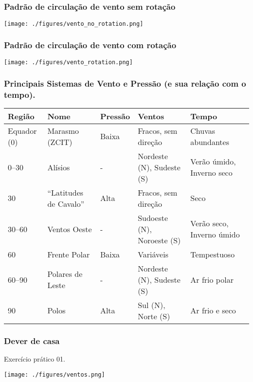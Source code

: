 \begin{frame}
  \frametitle{Padrão de circulação de vento {\bf sem} rotação}
  \begin{center}
    \texttt{[image: ./figures/vento\_no\_rotation.png]}
  \end{center}
\end{frame}

\begin{frame}
  \frametitle{Padrão de circulação de vento {\bf com} rotação}
  \begin{center}
    \texttt{[image: ./figures/vento\_rotation.png]}
  \end{center}
\end{frame}

\begin{frame}
\frametitle{Principais Sistemas de Vento e Pressão (e sua relação com o tempo).}
{\tiny
\begin{table}
    \begin{tabular}{lllll}
    Região                           & Nome                     & Pressão & Ventos                     & Tempo                     \\
        \hline
    Equador (0\textdegree{})         & Marasmo (ZCIT)           & Baixa   & Fracos, sem direção        & Chuvas abundantes         \\
    0\textdegree{}--30\textdegree{}  & Alísios                  & -       & Nordeste (N), Sudeste (S)  & Verão úmido, Inverno seco \\
    30\textdegree{}                  & ``Latitudes de Cavalo''  & Alta    & Fracos, sem direção        & Seco                      \\
    30\textdegree{}--60\textdegree{} & Ventos Oeste             & -       & Sudoeste (N), Noroeste (S) & Verão seco, Inverno úmido \\
    60\textdegree{}                  & Frente Polar             & Baixa   & Variáveis                  & Tempestuoso               \\
    60\textdegree{}--90\textdegree{} & Polares de Leste         & -       & Nordeste (N), Sudeste (S)  & Ar frio polar             \\
    90\textdegree{}                  & Polos                    & Alta    & Sul (N), Norte (S)         & Ar frio e seco            \\
    \hline
    \end{tabular}
\end{table}
}
\end{frame}

\begin{frame}
\frametitle{Dever de casa}
  \begin{block}{}
    Exercício prático 01.
  \end{block}
  \begin{center}
    \texttt{[image: ./figures/ventos.png]}
  \end{center}
\end{frame}


